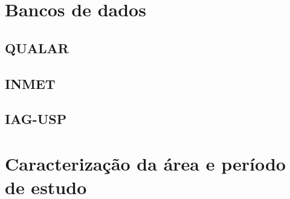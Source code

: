 \chapter{Bancos de dados}



\lipsum[100]



\section{QUALAR}



\lipsum[100]



\section{INMET}



\lipsum[100]


\section{IAG-USP}



\lipsum[100]



\chapter{Caracterização da área e período de estudo}

